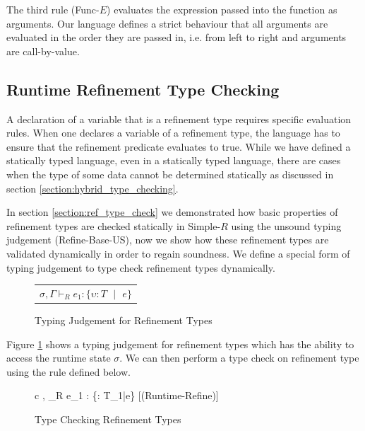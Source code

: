 \documentclass[a4paper,12pt]{report}
\begin{document}
\par
The third rule (Func-$E$) evaluates the expression passed into the 
function as arguments. Our language defines a strict behaviour that all 
arguments are evaluated in the order they are passed in, i.e. from left to right 
and arguments are call-by-value.

\subsection{Runtime Refinement Type Checking} \label{section:runtime_refine}
A declaration of a variable that is a refinement type requires specific 
evaluation rules. When one declares a variable of a refinement type, the language 
has to ensure that the refinement predicate evaluates to true. While we have 
defined a statically typed language, even in a statically typed language, 
there are cases when the type of some data cannot be determined statically as 
discussed in section \ref{section:hybrid_type_checking}.

\par
In section \ref{section:ref_type_check} we demonstrated how basic properties 
of refinement types are checked statically in Simple-$R$ using 
the unsound typing judgement (Refine-Base-US), now we show 
how these refinement types are validated dynamically in order to regain soundness. 
We define a special form of typing judgement to type check refinement types 
dynamically.

\begin{figure}[H]
  \begin{center}
    \begin{tabular} {c}
      $\sigma, \Gamma \vdash_{R} e_1 : \{\upsilon : T \text{ }|\text{ }e\}$
    \end{tabular}
  \end{center}
  \caption{Typing Judgement for Refinement Types}
  \label{fig:refine_judgement}
\end{figure}

\par
Figure \ref{fig:refine_judgement} shows a typing judgement for refinement 
types which has the ability to access the runtime state $\sigma$. We can then 
perform a type check on refinement type using the rule defined below. 

\begin{figure}[H]
  \begin{center}
    \begin{tabular} {c}
      {\sigma, \Gamma \vdash_{R} e_1 : \{\upsilon : T_1\text{ }|\text{ }e\}} [(Runtime-Refine)]
    \end{tabular}
  \end{center}
  \caption{Type Checking Refinement Types}
  \label{fig:refine_typecheck}
\end{figure}
\end{document}
